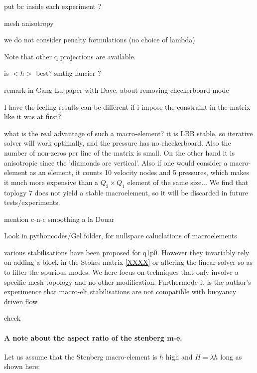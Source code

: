 put bc inside each experiment ?

mesh anisotropy

we do not consider penalty formulations (no choice of lambda)

Note that other q projections are available.

is $<h>$ best? smthg fancier ?

remark in Gang Lu paper with Dave, about removing checkerboard mode


I have the feeling results can be different if i impose the
constraint in the matrix like it was at first?


what is the real advantage of such a macro-element? it is LBB stable, so 
iterative solver will work optimally, and the pressure has no checkerboard.
Also the number of non-zeros per line of the matrix is small.  
On the other hand it is anisotropic since the 'diamonds are vertical'. 
Also if one would consider a macro-element as an element, it counts 10 velocity nodes and 5 pressures, 
which makes it much more expensive than a $Q_2\times Q_1$ element of the same size...
We find that toplogy 7 does not yield a stable macroelement, so it will be discarded in 
future tests/experiments.

mention c-n-c smoothing a la Douar

Look in pythoncodes/Gel folder, for nullspace caluclations of macroelements

various stabilisations have been proposed for q1p0. However they invariably 
rely on adding a block in the Stokes matrix \ref{XXXX} or altering the 
linear solver so as to filter the spurious modes. 
We here focus on techniques that only involve a specific mesh topology and 
no other modification.
Furthermode it is the author's experimence that 
macro-elt stabilisations are not compatible with buoyancy driven flow

check \cite{nath93}


\paragraph{A note about the aspect ratio of the stenberg m-e.}
Let us assume that the Stenberg macro-element is $h$ high and $H=\lambda h$ long
as shown here:

